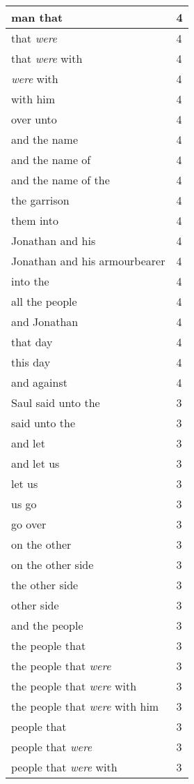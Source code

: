 \begin{center}
\begin{longtable}{|p{3.0in}|p{0.5in}|}
man that & 4\\ \hline 
that \emph{were} & 4\\ \hline 
that \emph{were} with & 4\\ \hline 
\emph{were} with & 4\\ \hline 
with him & 4\\ \hline 
over unto & 4\\ \hline 
and the name & 4\\ \hline 
and the name of & 4\\ \hline 
and the name of the & 4\\ \hline 
the garrison & 4\\ \hline 
them into & 4\\ \hline 
Jonathan and his & 4\\ \hline 
Jonathan and his armourbearer & 4\\ \hline 
into the & 4\\ \hline 
all the people & 4\\ \hline 
and Jonathan & 4\\ \hline 
that day & 4\\ \hline 
this day & 4\\ \hline 
and against & 4\\ \hline 
Saul said unto the & 3\\ \hline 
said unto the & 3\\ \hline 
and let & 3\\ \hline 
and let us & 3\\ \hline 
let us & 3\\ \hline 
us go & 3\\ \hline 
go over & 3\\ \hline 
on the other & 3\\ \hline 
on the other side & 3\\ \hline 
the other side & 3\\ \hline 
other side & 3\\ \hline 
and the people & 3\\ \hline 
the people that & 3\\ \hline 
the people that \emph{were} & 3\\ \hline 
the people that \emph{were} with & 3\\ \hline 
the people that \emph{were} with him & 3\\ \hline 
people that & 3\\ \hline 
people that \emph{were} & 3\\ \hline 
people that \emph{were} with & 3\\ \hline 

\end{longtable}
\end{center}
